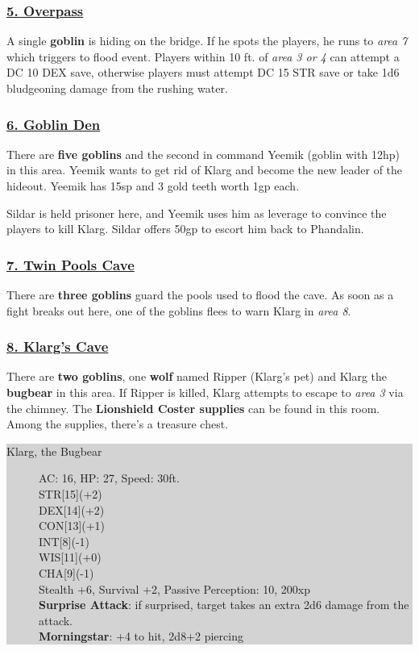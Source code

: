 \subsubsection*{\underline{5. Overpass}}
A single \textbf{goblin} is hiding on the bridge. If he spots the players, he runs to \emph{area 7} which triggers to flood event. Players within 10 ft. of \emph{area 3 or 4} can attempt a DC 10 DEX save, otherwise players must attempt DC 15 STR save or take 1d6 bludgeoning damage from the rushing water.

\subsubsection*{\underline{6. Goblin Den}}
There are \textbf{five goblins} and the second in command Yeemik (goblin with 12hp) in this area. Yeemik wants to get rid of Klarg and become the new leader of the hideout. Yeemik has 15sp and 3 gold teeth worth 1gp each. 

Sildar is held prisoner here, and Yeemik uses him as leverage to convince the players to kill Klarg. Sildar offers 50gp to escort him back to Phandalin.

\subsubsection*{\underline{7. Twin Pools Cave}}
There are \textbf{three goblins} guard the pools used to flood the cave. As soon as a fight breaks out here, one of the goblins flees to warn Klarg in \emph{area 8}.

\subsubsection*{\underline{8. Klarg's Cave}}
There are \textbf{two goblins}, one \textbf{wolf} named Ripper (Klarg's pet) and Klarg the \textbf{bugbear} in this area. If Ripper is killed, Klarg attempts to escape to \emph{area 3} via the chimney. The \textbf{Lionshield Coster supplies} can be found in this room. Among the supplies, there's a treasure chest. 

\colorbox{lightgray}{\begin{minipage}{0.4\textwidth}
\begin{description}
	\item[Klarg, the Bugbear] 
	AC: 16, HP: 27, Speed: 30ft.
	\\ STR[15](+2) 
	\\ DEX[14](+2)
	\\ CON[13](+1)
	\\ INT[8](-1)
	\\ WIS[11](+0)
	\\ CHA[9](-1) 
	\\ Stealth +6, Survival +2, Passive Perception: 10, 200xp
	\\ \textbf{Surprise Attack}: if surprised, target takes an extra 2d6 damage from the attack.
	\\ \textbf{Morningstar}: +4 to hit, 2d8+2 piercing
\end{description}
\end{minipage}}
\break

